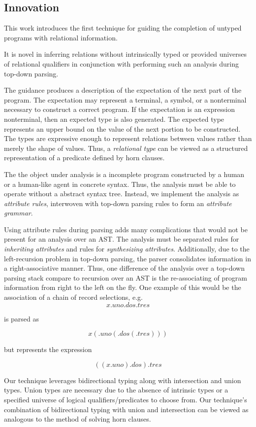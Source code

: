 \documentclass[sigplan,screen,review]{acmart}
\begin{document}
\subsection{Innovation}
This work introduces the first technique for guiding the completion of untyped programs with relational information. 

It is novel in inferring relations without intrinsically typed or provided universes of relational qualifiers 
in conjunction with performing such an analysis during top-down parsing.

The guidance produces a description of the expectation of the next part of the program.
The expectation may represent a terminal, a symbol, or 
a nonterminal necessary to construct a correct program. If the expectation is an expression 
nonterminal, then an expected type is also generated. The expected type represents an upper bound
on the value of the next portion to be constructed. The types are expressive enough to represent relations 
between values rather than merely the shape of values. Thus, a \textit{relational type} can be viewed 
as a structured representation of a predicate defined by horn clauses. 

The the object under analysis is a incomplete program constructed by a human or a human-like agent in concrete syntax. 
Thus, the analysis must be able to operate without a abstract syntax tree. Instead, we implement the analysis 
as \textit{attribute rules}, interwoven with top-down parsing rules to form an \textit{attribute grammar}. 

Using attribute rules during parsing adds many complications that would not be present for an
analysis over an AST. 
The analysis must be separated rules for \textit{inheriting attributes} and rules for \textit{synthesizing attributes}.
Additionally, due to the left-recursion problem in top-down parsing, 
the parser consolidates information in a right-associative manner.
Thus, one difference of the analysis over a top-down parsing stack compare to recursion over an AST is 
the re-associating of program information from right to the left on the fly. 
One example of this would be the association of a chain of record selections, e.g.  
\[ 
x.uno.dos.tres 
\]

\noindent is parsed as

\[ 
x(.uno(.dos(.tres)))
\]

\noindent but represents the expression 

\[ 
((x.uno).dos).tres
\]

Our technique leverages bidirectional typing along with intersection and union types. Union types are necessary due to
the absence of intrinsic types or a specified universe of logical qualifiers/predicates to choose from. 
Our technique's combination of bidirectional typing with union and intersection can be viewed as analogous to the  method
of solving horn clauses.
\end{document}

